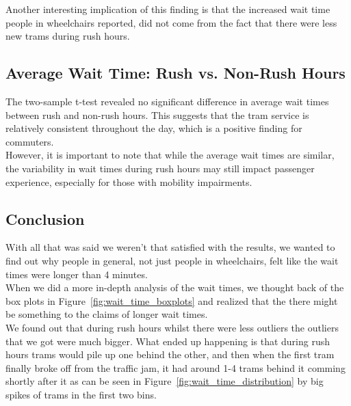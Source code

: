 \documentclass[a4paper, 10pt]{article}
\begin{document}
			\noindent Another interesting implication of this finding is that the increased wait time people in wheelchairs reported,
			did not come from the fact that there were less new trams during rush hours.

		\subsection{Average Wait Time: Rush vs. Non-Rush Hours}
			\noindent The two-sample t-test revealed no significant difference in average wait times between rush and non-rush hours. 
			This suggests that the tram service is relatively consistent throughout the day, which is a positive finding for commuters. \\

			\noindent However, it is important to note that while the average wait times are similar, 
			the variability in wait times during rush hours may still impact passenger experience, 
			especially for those with mobility impairments. \\

		\subsection{Conclusion}
			\noindent With all that was said we weren't that satisfied with the results, we wanted to find out why people in general,
			not just people in wheelchairs, felt like the wait times were longer than 4 minutes. \\

			\noindent When we did a more in-depth analysis of the wait times, we thought back of the box plots
			in Figure~\ref{fig:wait_time_boxplots} and realized that the there might be something to the claims of longer wait times. \\

			\noindent We found out that during rush hours whilst there were less outliers the outliers that we got were much bigger.
			What ended up happening is that during rush hours trams would pile up one behind the other, 
			and then when the first tram finally broke off from the traffic jam, it had around 1-4 trams behind it comming shortly after
			it as can be seen in Figure~\ref{fig:wait_time_distribution} by big spikes of trams in the first two bins. \\
\end{document}
